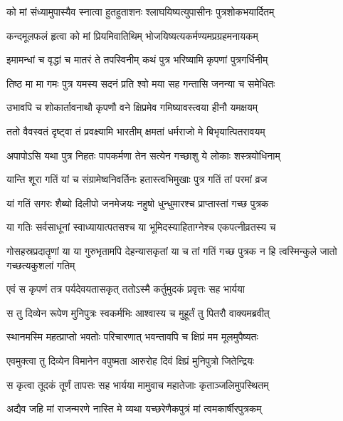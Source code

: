 \twolineshloka
{को मां संध्यामुपास्यैव स्नात्वा हुतहुताशनः}
{श्लाघयिष्यत्युपासीनः पुत्रशोकभयार्दितम्} %

\twolineshloka
{कन्दमूलफलं हृत्वा को मां प्रियमिवातिथिम्}
{भोजयिष्यत्यकर्मण्यमप्रग्रहमनायकम्} %

\twolineshloka
{इमामन्धां च वृद्धां च मातरं ते तपस्विनीम्}
{कथं पुत्र भरिष्यामि कृपणां पुत्रगर्धिनीम्} %

\twolineshloka
{तिष्ठ मा मा गमः पुत्र यमस्य सदनं प्रति}
{श्वो मया सह गन्तासि जनन्या च समेधितः} %

\twolineshloka
{उभावपि च शोकार्तावनाथौ कृपणौ वने}
{क्षिप्रमेव गमिष्यावस्त्वया हीनौ यमक्षयम्} %

\twolineshloka
{ततो वैवस्वतं दृष्ट्वा तं प्रवक्ष्यामि भारतीम्}
{क्षमतां धर्मराजो मे बिभृयात्पितरावयम्} %

\twolineshloka
{अपापोऽसि यथा पुत्र निहतः पापकर्मणा}
{तेन सत्येन गच्छाशु ये लोकाः शस्त्रयोधिनाम्} %

\twolineshloka
{यान्ति शूरा गतिं यां च संग्रामेष्वनिवर्तिनः}
{हतास्त्वभिमुखाः पुत्र गतिं तां परमां व्रज} %

\twolineshloka
{यां गतिं सगरः शैब्यो दिलीपो जनमेजयः}
{नहुषो धुन्धुमारश्च प्राप्तास्तां गच्छ पुत्रक} %

\twolineshloka
{या गतिः सर्वसाधूनां स्वाध्यायात्पतसश्च या}
{भूमिदस्याहिताग्नेश्च एकपत्नीव्रतस्य च} %

\threelineshloka
{गोसहस्रप्रदातॄणां या या गुरुभृतामपि}
{देहन्यासकृतां या च तां गतिं गच्छ पुत्रक}
{न हि त्वस्मिन्कुले जातो गच्छत्यकुशलां गतिम्} %

\twolineshloka
{एवं स कृपणं तत्र पर्यदेवयतासकृत्}
{ततोऽस्मै कर्तुमुदकं प्रवृत्तः सह भार्यया} %

\twolineshloka
{स तु दिव्येन रूपेण मुनिपुत्रः स्वकर्मभिः}
{आश्वास्य च मुहूर्तं तु पितरौ वाक्यमब्रवीत्} %

\twolineshloka
{स्थानमस्मि महत्प्राप्तो भवतोः परिचारणात्}
{भवन्तावपि च क्षिप्रं मम मूलमुपैष्यतः} %

\twolineshloka
{एवमुक्त्वा तु दिव्येन विमानेन वपुष्मता}
{आरुरोह दिवं क्षिप्रं मुनिपुत्रो जितेन्द्रियः} %

\twolineshloka
{स कृत्वा तूदकं तूर्णं तापसः सह भार्यया}
{मामुवाच महातेजाः कृताञ्जलिमुपस्थितम्} %

\twolineshloka
{अद्यैव जहि मां राजन्मरणे नास्ति मे व्यथा}
{यच्छरेणैकपुत्रं मां त्वमकार्षीरपुत्रकम्} %

